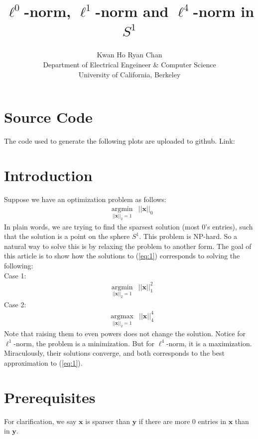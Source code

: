 \documentclass[11pt]{article}
\begin{document}
\title{$\ell^0$-norm, $\ell^1$-norm and $\ell^4$-norm in $S^1$}
\author{Kwan Ho Ryan Chan\\Department of Electrical Engeineer \& Computer Science\\University of California, Berkeley}
\maketitle

\section{Source Code}
	The code used to generate the following plots are uploaded to github. Link: 
\section{Introduction}
Suppose we have an optimization problem as follows:
\begin{equation}
\begin{aligned}
     & \underset{||\bm{x}||_2=1}{\text{argmin}} & ||\bm{x}||_0  \label{eq:1}
\end{aligned}
\end{equation}
In plain words, we are trying to find the sparsest solution (most 0's entries), such that the solution
is a point on the sphere $S^1$. This problem is NP-hard. So a natural way to solve this is by relaxing the problem to another form. The goal of this article is to show how the solutions to (\ref{eq:1}) corresponds to solving the following: \\
Case 1:
\begin{equation}
\begin{aligned}
     & \underset{||\bm{x}||_2=1}{\text{argmin}} & ||\bm{x}||_1^2  \label{eq:2}
\end{aligned}
\end{equation}
Case 2:  
\begin{equation}
\begin{aligned}
     & \underset{||\bm{x}||_2=1}{\text{argmax}} & ||\bm{x}||_4^4  \label{eq:3}
\end{aligned}
\end{equation}
Note that raising them to even powers does not change the solution. Notice for $\ell^1$-norm, the problem is a minimization. But for $\ell^4$-norm, it is a maximization. Miraculously, their solutions converge, and both corresponds to the best approximation to (\ref{eq:1}).  

\section{Prerequisites}
For clarification, we say $\bm{x}$ is sparser than $\bm{y}$ if there are more 0 entries in $\bm{x}$ than in $\bm{y}$. 
\end{document}
